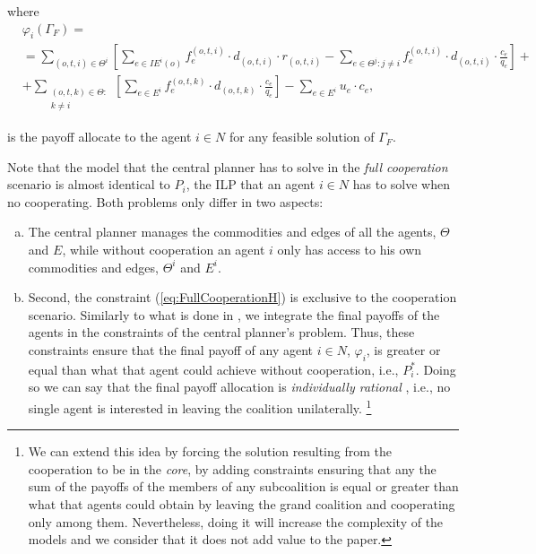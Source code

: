 \documentclass[review]{elsarticle}
\begin{document}
where 
\begin{equation}
    \begin{split}
    & \varphi_i(\Gamma_F) =\label{eq:FullCooperationPayoff} \\
    & = \sum_{(o,t,i)\in \Theta^i} \left[ \sum_{e \in IE^i(o)} f_e^{(o,t,i)} \cdot d_{(o,t,i)} \cdot r_{(o,t,i)} -  \sum_{e\in \Theta^j \colon j\not = i} f_e^{(o,t,i)} \cdot d_{(o,t,i)} \cdot \frac{c_e}{q_e} \right] + \\
    & + \sum_{\substack{(o,t,k) \in \Theta  \colon \\ k \not = i}} \left[\sum_{e \in E^i} f_e^{(o,t,k)} \cdot d_{(o,t,k)} \cdot \frac{c_e}{q_e}\right] - \sum_{e \in E^i} u_e \cdot c_e, 
    \end{split}
\end{equation}

is the payoff allocate to the agent $i\in N$ for any feasible solution
of $\Gamma_F$.

Note that the model that the central planner has to solve in the
\emph{full cooperation} scenario is almost identical to $P_ i$, the ILP that an
agent $i\in N$ has to solve when no cooperating. Both problems only differ in
two aspects:
\begin{enumerate}[(a)]
	\item The central planner manages the commodities and edges of
all the agents, $\Theta$ and $E$, while without cooperation an agent $i$ only has access to his own commodities and edges, $\Theta^i$ and $E^i$.
	\item Second, the constraint (\ref{eq:FullCooperationH}) is exclusive to the cooperation scenario. Similarly to what is done in \cite{VANOVERMEIRE2014125}, we integrate the final payoffs of the agents in the constraints of the central planner's problem. Thus, these constraints ensure that the final payoff of any agent $i\in N$, $\varphi_i$, is greater or equal than what that agent could achieve without cooperation, i.e., $P_i^*$.  Doing so we can say that the final payoff allocation is \emph{individually rational} \cite{GONZALEZ2010}, i.e., no single agent is interested in leaving the coalition unilaterally.  \footnote{We can extend this idea by forcing the solution resulting from the cooperation to be in the \emph{core}, by adding constraints ensuring that any the sum of the payoffs of the members of any subcoalition is equal or greater than what that agents could obtain by leaving the grand coalition and cooperating only among them. Nevertheless, doing it will increase the complexity of the models and we consider that it does not add value to the paper.}
\end{enumerate}
\end{document}
